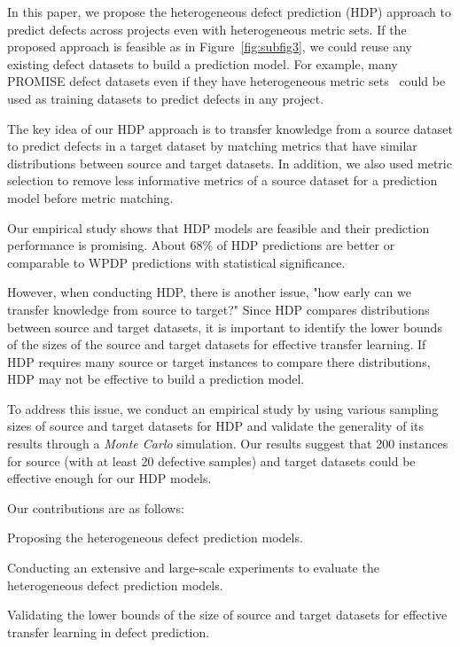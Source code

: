 
In this paper, we propose the heterogeneous defect prediction (HDP) approach
to predict defects across projects even with heterogeneous metric
sets.
If the proposed approach is feasible as in
Figure~\ref{fig:subfig3}, we could reuse any existing defect
datasets to build a prediction model. For example, many PROMISE defect datasets
even if they have heterogeneous metric sets~\cite{promise12} could be used as
training datasets to predict defects in any project.

The key idea of our HDP approach is to transfer knowledge from a source dataset to predict defects in a target dataset by matching metrics that have
similar distributions between source and target datasets. In addition, we also
used metric selection to remove less informative metrics of a source dataset
for a prediction model before metric matching.

Our empirical study shows that HDP models are feasible and their prediction
performance is promising. About 68\% of HDP predictions
are better or comparable to WPDP predictions with statistical
significance.

However, when conducting HDP, there is another issue, "how early can we transfer knowledge from source to target?" Since HDP compares distributions between source and target datasets, it is important to identify the lower bounds of the sizes of the source and target datasets for effective transfer learning. If HDP requires many source or target instances to compare there distributions, HDP may not be effective to build a prediction model.

To address this issue, we conduct an empirical study by using various sampling sizes of source and target datasets for HDP and validate the generality of its results through a {\em Monte Carlo} simulation. Our results suggest that 200 instances for source (with at least 20 defective samples) and target datasets could be effective enough for our HDP models.


Our contributions are as follows:
\squishlist
  \item Proposing the heterogeneous defect prediction models.
  \item Conducting an extensive and large-scale experiments to evaluate
  the heterogeneous defect prediction models.
  \item Validating the lower bounds of the size of source and target datasets for effective transfer learning in defect prediction.
\squishend

